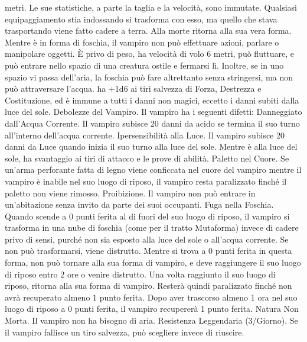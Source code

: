 \begin{multicols}{2}
metri. Le sue statistiche, a parte la taglia e la velocità, sono
immutate. Qualsiasi equipaggiamento stia indossando si
trasforma con esso, ma quello che stava trasportando viene fatto
cadere a terra. Alla morte ritorna alla sua vera forma.
Mentre è in forma di foschia, il vampiro non può effettuare
azioni, parlare o manipolare oggetti. È privo di peso, ha velocità
di volo 6 metri, può fluttuare, e può entrare nello spazio di una
creatura ostile e fermarsi lì. Inoltre, se in uno spazio vi passa
dell’aria, la foschia può fare altrettanto senza stringersi, ma non
può attraversare l’acqua. ha +1d6 ai tiri salvezza di Forza,
Destrezza e Costituzione, ed è immune a tutti i danni non magici,
eccetto i danni subiti dalla luce del sole.
Debolezze del Vampiro. Il vampiro ha i seguenti difetti:
Danneggiato dall’Acqua Corrente. Il vampiro subisce 20 danni
da acido se termina il suo turno all’interno dell’acqua corrente.
Ipersensibilità alla Luce. Il vampiro subisce 20 danni da Luce
quando inizia il suo turno alla luce del sole. Mentre è alla luce
del sole, ha svantaggio ai tiri di attacco e le prove di abilità.
Paletto nel Cuore. Se un’arma perforante fatta di legno viene
conficcata nel cuore del vampiro mentre il vampiro è inabile nel
suo luogo di riposo, il vampiro resta paralizzato finché il paletto
non viene rimosso.
Proibizione. Il vampiro non può entrare in un’abitazione senza
invito da parte dei suoi occupanti.
Fuga nella Foschia. Quando scende a 0 punti ferita al di fuori
del suo luogo di riposo, il vampiro si trasforma in una nube di
foschia (come per il tratto Mutaforma) invece di cadere privo di
sensi, purché non sia esposto alla luce del sole o all’acqua
corrente. Se non può trasformarsi, viene distrutto.
Mentre si trova a 0 punti ferita in questa forma, non può tornare
alla sua forma di vampiro, e deve raggiungere il suo luogo di
riposo entro 2 ore o venire distrutto. Una volta raggiunto il suo
luogo di riposo, ritorna alla sua forma di vampiro. Resterà quindi
paralizzato finché non avrà recuperato almeno 1 punto ferita.
Dopo aver trascorso almeno 1 ora nel suo luogo di riposo a 0
punti ferita, il vampiro recupererà 1 punto ferita.
Natura Non Morta. Il vampiro non ha bisogno di aria.
Resistenza Leggendaria (3/Giorno). Se il vampiro fallisce un
tiro salvezza, può scegliere invece di riuscire.
 

\end{multicols}
